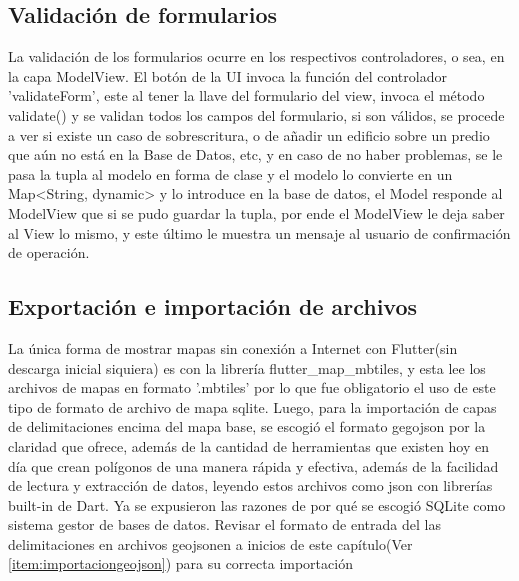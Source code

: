 \subsection{Validación de formularios}
La validación de los formularios ocurre en los respectivos controladores, o sea, en la capa ModelView. El botón de la UI invoca la función del controlador 'validateForm', este al tener la llave del formulario del view,
invoca el método validate() y se validan todos los campos del formulario, si son válidos, se procede a ver si existe un caso de sobrescritura, o de añadir un edificio sobre un predio que aún no está en la Base de Datos, etc,
y en caso de no haber problemas, se le pasa la tupla al modelo en forma de clase y el modelo lo convierte en un Map<String, dynamic> y lo introduce en la base de datos, el Model responde al ModelView que si se pudo guardar la tupla,
por ende el ModelView le deja saber al View lo mismo, y este último le muestra un mensaje al usuario de confirmación de operación.

\subsection{Exportación e importación de archivos}
La única forma de mostrar mapas sin conexión a Internet con Flutter(sin descarga inicial siquiera) es con la librería flutter\_map\_mbtiles, y esta lee los archivos de mapas en formato '.mbtiles' por lo que fue obligatorio el uso de este tipo de formato de archivo de mapa
sqlite. Luego, para la importación de capas de delimitaciones encima del mapa base, se escogió el formato gegojson por la claridad que ofrece, además de la cantidad de herramientas que existen hoy en día que crean polígonos
de una manera rápida y efectiva, además de la facilidad de lectura y extracción de datos, leyendo estos archivos como json con librerías built-in de Dart. Ya se expusieron las razones de por qué se escogió SQLite como sistema gestor de bases de datos.
Revisar el formato de entrada del las delimitaciones en archivos geojsonen a inicios de este capítulo(Ver \ref{item:importaciongeojson}) para su correcta importación

